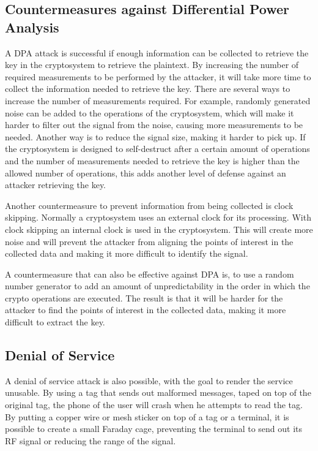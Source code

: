 \cite{kocher2009differential}

\subsection{Countermeasures against Differential Power Analysis}
A DPA attack is successful if enough information can be collected to retrieve the key in the cryptosystem to retrieve the plaintext.
By increasing the number of required measurements to be performed by the attacker, it will take more time to collect the information needed to retrieve the key. 
There are several ways to increase the number of measurements required.
For example, randomly generated noise can be added to the operations of the cryptosystem, which will make it harder to filter out the signal from the noise, causing more measurements to be needed.
Another way is to reduce the signal size, making it harder to pick up. 
If the cryptosystem is designed to self-destruct after a certain amount of operations and the number of measurements needed to retrieve the key is higher than the allowed number of operations, this adds another level of defense against an attacker retrieving the key.

Another countermeasure to prevent information from being collected is clock skipping.
Normally a cryptosystem uses an external clock for its processing.
With clock skipping an internal clock is used in the cryptosystem.
This will create more noise and will prevent the attacker from aligning the points of interest in the collected data and making it more difficult to identify the signal. 

A countermeasure that can also be effective against DPA is, to use a random number generator to add an amount of unpredictability in the order in which the crypto operations are executed.
The result is that it will be harder for the attacker to find the points of interest in the collected data, making it more difficult to extract the key. \cite{kocher2009differential}


\subsection{Denial of Service}
A denial of service attack is also possible, with the goal to render the service unusable. By using a tag that sends out malformed messages, taped on top of the original tag, the phone of the user will crash when he attempts to read the tag.
By putting a copper wire or mesh sticker on top of a tag or a terminal, it is possible to create a small Faraday cage, preventing the terminal to send out its RF signal or reducing the range of the signal. \cite{rieback2006your}

